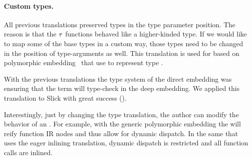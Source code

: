 \paragraph{Custom types.} All previous translations preserved types in the type parameter position. The reason is that the $\tau$ functions behaved like a higher-kinded type. If we would like to map some of the base types in a custom way, those types need to be changed in the position of type-arguments as well. This translation is used for \edsls based on polymorphic embedding~\cite{hofer_polymorphic_2008} that use  to represent type .

With the previous translations the type system of the direct embedding was
ensuring that the term will type-check in the deep embedding. We applied this
translation to Slick \cite{slick} with great success ().

Interestingly, just by changing the type translation, the \edsl author can modify the behavior of an \edsl.  For example, with the generic polymorphic embedding the \edsl will reify function IR nodes and thus allow for dynamic dispatch. In the same \edsl that uses the eager inlining translation, dynamic dispatch is restricted and all function calls are inlined.

